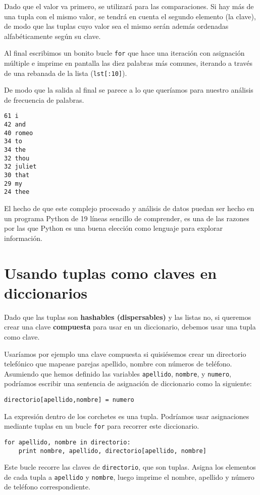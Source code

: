 Dado que el valor va primero, se utilizará para las comparaciones.
Si hay más de una tupla con el mismo valor, se tendrá en cuenta
el segundo elemento (la clave), de modo que las tuplas cuyo valor sea
el mismo serán además ordenadas alfabéticamente según su clave.

Al final escribimos un bonito bucle {\tt for} que hace una iteración con
asignación múltiple e imprime en pantalla las diez palabras más comunes,
iterando a través de una rebanada de la lista ({\tt lst[:10]}).

De modo que la salida al final se parece a lo que queríamos para
nuestro análisis de frecuencia de palabras.

\beforeverb
\begin{verbatim}
61 i
42 and
40 romeo
34 to
34 the
32 thou
32 juliet
30 that
29 my
24 thee
\end{verbatim}
\afterverb
%
El hecho de que este complejo procesado y análisis de datos
puedan ser hecho en un programa Python de 19 líneas
sencillo de comprender, es una de las razones por las que Python es una buena elección
como lenguaje para explorar información.

\section{Usando tuplas como claves en diccionarios}


Dado que las tuplas son {\bf hashables (dispersables)} y las listas no, si queremos
crear una clave {\bf compuesta} para usar en un diccionario, debemos usar una tupla
como clave.

Usaríamos por ejemplo una clave compuesta si quisiésemos crear un
directorio telefónico que mapease
parejas apellido, nombre con números de teléfono. Asumiendo
que hemos definido las variables
{\tt apellido}, {\tt nombre}, y {\tt numero}, podríamos escribir
una sentencia de asignación de diccionario como la siguiente:

\beforeverb
\begin{verbatim}
directorio[apellido,nombre] = numero
\end{verbatim}
\afterverb
%
La expresión dentro de los corchetes es una tupla. Podríamos usar
asignaciones mediante tuplas en un bucle {\tt for} para recorrer este diccionario.


\beforeverb
\begin{verbatim}
for apellido, nombre in directorio:
    print nombre, apellido, directorio[apellido, nombre]
\end{verbatim}
\afterverb
%
Este bucle recorre las claves de {\tt directorio}, que son tuplas.
Asigna los elementos de cada tupla a {\tt apellido} y {\tt nombre}, luego
imprime el nombre, apellido y número de teléfono correspondiente.

